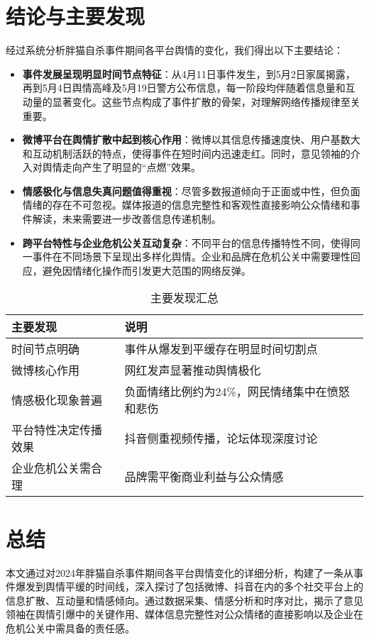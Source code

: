 \documentclass{article}
\begin{document}
\section{结论与主要发现}
经过系统分析胖猫自杀事件期间各平台舆情的变化，我们得出以下主要结论：
\begin{itemize}
    \item \textbf{事件发展呈现明显时间节点特征}：从4月11日事件发生，到5月2日家属揭露，再到5月4日舆情高峰及5月19日警方公布信息，每一阶段均伴随着信息量和互动量的显著变化。这些节点构成了事件扩散的骨架，对理解网络传播规律至关重要。
    \item \textbf{微博平台在舆情扩散中起到核心作用}：微博以其信息传播速度快、用户基数大和互动机制活跃的特点，使得事件在短时间内迅速走红。同时，意见领袖的介入对舆情走向产生了明显的“点燃”效果。
    \item \textbf{情感极化与信息失真问题值得重视}：尽管多数报道倾向于正面或中性，但负面情绪的存在不可忽视。媒体报道的信息完整性和客观性直接影响公众情绪和事件解读，未来需要进一步改善信息传递机制。
    \item \textbf{跨平台特性与企业危机公关互动复杂}：不同平台的信息传播特性不同，使得同一事件在不同场景下呈现出多样化舆情。企业和品牌在危机公关中需要理性回应，避免因情绪化操作而引发更大范围的网络反弹。
\end{itemize}
\begin{table}[htbp]
\centering
\caption{主要发现汇总}
\begin{tabular}{p{5cm}p{8cm}}
\toprule
主要发现 & 说明 \\
\midrule
时间节点明确 & 事件从爆发到平缓存在明显时间切割点 \\
微博核心作用 & 网红发声显著推动舆情极化 \\
情感极化现象普遍 & 负面情绪比例约为24\%，网民情绪集中在愤怒和悲伤 \\
平台特性决定传播效果 & 抖音侧重视频传播，论坛体现深度讨论 \\
企业危机公关需合理 & 品牌需平衡商业利益与公众情感 \\
\bottomrule
\end{tabular}
\end{table}

\section{总结}
本文通过对2024年胖猫自杀事件期间各平台舆情变化的详细分析，构建了一条从事件爆发到舆情平缓的时间线，深入探讨了包括微博、抖音在内的多个社交平台上的信息扩散、互动量和情感倾向。通过数据采集、情感分析和时序对比，揭示了意见领袖在舆情引爆中的关键作用、媒体信息完整性对公众情绪的直接影响以及企业在危机公关中需具备的责任感。
\end{document}
